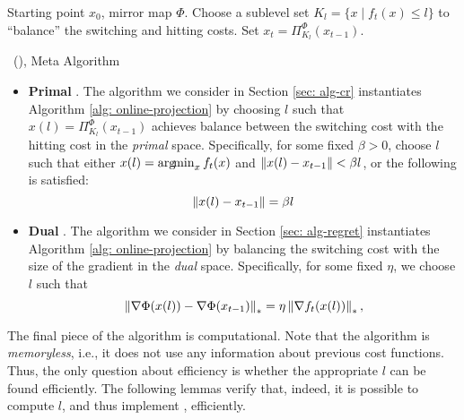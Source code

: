 
\begin{algorithm}[t]
	\begin{algorithmic}[1]
			\REQUIRE Starting point $x_0$, mirror map $\Phi$.
			\STATE Choose a sublevel set $K_l = \{ x \mid f_t(x) \le l\}$ to ``balance'' the switching and hitting costs.  \label{alg:meta-balance}
			  \STATE Set $x_t = \Pi^{\Phi}_{K_l}(x_{t-1})$.
              \label{alg: gradient-step}
			\ENDFOR
	\end{algorithmic}
\caption{\ouralg\ (\ourack), Meta Algorithm}
\label{alg: online-projection}
\end{algorithm}

\begin{itemize}
\item{\textbf{Primal \ouralg}}.  The algorithm we consider in Section \ref{sec: alg-cr} instantiates Algorithm \ref{alg: online-projection} by choosing $l$ such that $x(l) = \Pi^\Phi_{K_l}(x_{t-1})$ achieves balance between the switching cost with the hitting cost in the \emph{primal} space. Specifically, for some fixed $\beta>0$, choose $l$ such that either $x(l) = \operatorname*{arg\!min}_x f_t(x)$ and $\left\lVert x(l) - x_{t-1} \right\rVert < \beta l $, or the following is satisfied:
\begin{equation}
\left\lVert x(l) - x_{t-1} \right\rVert = \beta l
\label{eqn: primal-balance}
\end{equation}

\item{\textbf{Dual \ouralg}}. The algorithm we consider in Section \ref{sec: alg-regret} instantiates Algorithm \ref{alg: online-projection} by balancing the switching cost with the size of the gradient in the \emph{dual} space.  Specifically, for some fixed $\eta$, we choose $l$ such that 
\begin{equation}
\left\lVert \nabla \Phi(x(l)) - \nabla \Phi(x_{t-1}) \right\rVert_* = \eta \left\lVert \nabla f_t(x(l)) \right\rVert_*,
\label{eqn: dual-balance}
\end{equation}
\end{itemize}

The final piece of the algorithm is computational.  Note that the algorithm is \emph{memoryless}, i.e., it does not use any information about previous cost functions.  Thus, the only question about efficiency is whether the appropriate $l$ can be found efficiently.  The following lemmas verify that, indeed, it is possible to compute $l$, and thus implement \ourack, efficiently.  

